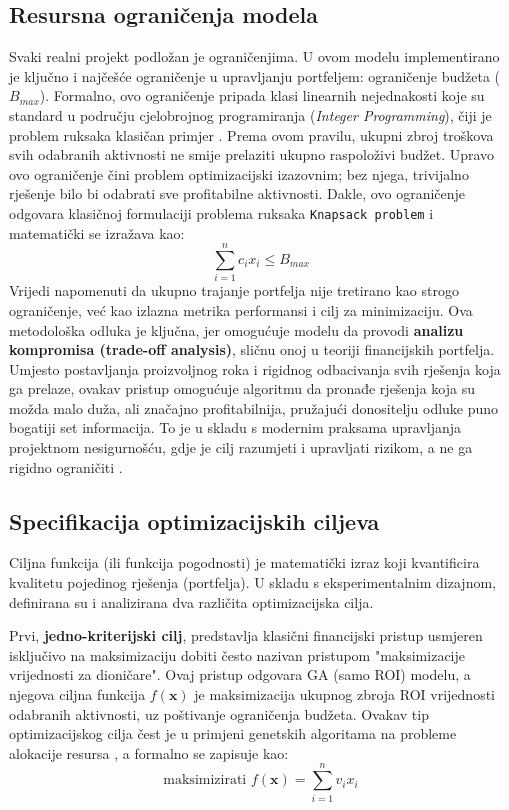 \subsection{Resursna ograničenja modela}
Svaki realni projekt podložan je ograničenjima. U ovom modelu implementirano je ključno i najčešće ograničenje u upravljanju portfeljem: ograničenje budžeta ($B_{max}$). Formalno, ovo ograničenje pripada klasi linearnih nejednakosti koje su standard u području cjelobrojnog programiranja (\textit{Integer Programming}), čiji je problem ruksaka klasičan primjer \cite{Glover1986}. Prema ovom pravilu, ukupni zbroj troškova svih odabranih aktivnosti ne smije prelaziti ukupno raspoloživi budžet. Upravo ovo ograničenje čini problem optimizacijski izazovnim; bez njega, trivijalno rješenje bilo bi odabrati sve profitabilne aktivnosti. Dakle, ovo ograničenje odgovara klasičnoj formulaciji problema ruksaka \texttt{Knapsack problem}\cite{Kellerer2004} i matematički se izražava kao:
$$
\sum_{i=1}^n c_i x_i \leq B_{max}
$$
Vrijedi napomenuti da ukupno trajanje portfelja nije tretirano kao strogo ograničenje, već kao izlazna metrika performansi i cilj za minimizaciju. Ova metodološka odluka je ključna, jer omogućuje modelu da provodi \textbf{analizu kompromisa (trade-off analysis)}, sličnu onoj u teoriji financijskih portfelja. Umjesto postavljanja proizvoljnog roka i rigidnog odbacivanja svih rješenja koja ga prelaze, ovakav pristup omogućuje algoritmu da pronađe rješenja koja su možda malo duža, ali značajno profitabilnija, pružajući donositelju odluke puno bogatiji set informacija. To je u skladu s modernim praksama upravljanja projektnom nesigurnošću, gdje je cilj razumjeti i upravljati rizikom, a ne ga rigidno ograničiti \cite{Smith2014}.

\subsection{Specifikacija optimizacijskih ciljeva}
Ciljna funkcija (ili funkcija pogodnosti) je matematički izraz koji kvantificira kvalitetu pojedinog rješenja (portfelja). U skladu s eksperimentalnim dizajnom, definirana su i analizirana dva različita optimizacijska cilja.

Prvi, \textbf{jedno-kriterijski cilj}, predstavlja klasični financijski pristup usmjeren isključivo na maksimizaciju dobiti često nazivan pristupom "maksimizacije vrijednosti za dioničare". Ovaj pristup odgovara GA (samo ROI) modelu, a njegova ciljna funkcija $f(\mathbf{x})$ je maksimizacija ukupnog zbroja ROI vrijednosti odabranih aktivnosti, uz poštivanje ograničenja budžeta. Ovakav tip optimizacijskog cilja čest je u primjeni genetskih algoritama na probleme alokacije resursa \cite{Goldberg1989}, a formalno se zapisuje kao:
$$ \text{maksimizirati } f(\mathbf{x}) = \sum_{i=1}^n v_i x_i $$

